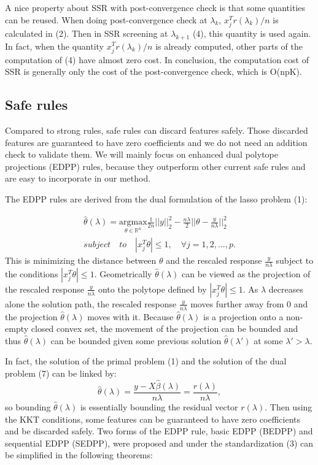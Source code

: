 \documentclass{article}
\begin{document}
A nice property about SSR with post-convergence check is that some quantities can be reused. When doing post-convergence check at $\lambda_k$, $x_j^Tr(\lambda_k)/n$ is calculated in (2). Then in SSR screening at $\lambda_{k+1}$ (4), this quantity is used again. In fact, when the quantity $x_j^Tr(\lambda_k)/n$ is already computed, other parts of the computation of (4) have almost zero cost. In conclusion, the computation cost of SSR is generally only the cost of the post-convergence check, which is O(npK).

\subsection{Safe rules}

Compared to strong rules, safe rules can discard features safely. Those discarded features are guaranteed to have zero coefficients and we do not need an addition check to validate them. We will mainly focus on enhanced dual polytope projections (EDPP) rules\cite{wang2013lasso}, because they outperform other current safe rules and are easy to incorporate in our method.

The EDPP rules are derived from the dual formulation of the lasso problem (1):

\begin{equation}
    \begin{split}
        \hat{\theta}(\lambda) = \underset{\theta\in \mathbb{R}^n}{\mathrm{argmax}}\frac{1}{2n}||y||_2^2-\frac{n\lambda}{2}||\theta-\frac{y}{n\lambda}||_2^2\\
        subject\quad to\quad |x_j^T\theta|\leq 1,\quad \forall j=1,2,...,p.
    \end{split}
\end{equation}
This is minimizing the distance between $\theta$ and the rescaled response $\frac{y}{n\lambda}$ subject to the conditions $|x_j^T\theta|\leq 1$. Geometrically $\hat{\theta}(\lambda)$ can be viewed as the projection of the rescaled response $\frac{y}{n\lambda}$ onto the polytope defined by $|x_j^T\theta|\leq 1$. As $\lambda$ decreases alone the solution path, the rescaled response $\frac{y}{n\lambda}$ moves further away from 0 and the projection $\hat{\theta}(\lambda)$ moves with it. Because $\hat{\theta}(\lambda)$ is a projection onto a non-empty closed convex set, the movement of the projection can be bounded and thus $\hat{\theta}(\lambda)$ can be bounded given some previous solution $\hat{\theta}(\lambda')$ at some $\lambda'>\lambda$.

In fact, the solution of the primal problem (1) and the solution of the dual problem (7) can be linked by:
\begin{equation}
    \hat{\theta}(\lambda)=\frac{y-X\hat{\beta}(\lambda)}{n\lambda}=\frac{r(\lambda)}{n\lambda},
\end{equation}
so bounding $\hat{\theta}(\lambda)$ is essentially bounding the residual vector $r(\lambda)$. Then using the KKT conditions, some features can be guaranteed to have zero coefficients and be discarded safely. Two forms of the EDPP rule, basic EDPP (BEDPP) and sequential EDPP (SEDPP)\cite{wang2013lasso}, were proposed and under the standardization (3) can be simplified in the following theorems\cite{zeng2017efficient}:
\end{document}
